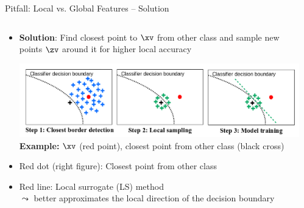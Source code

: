 \documentclass[11pt,compress,t,notes=noshow, aspectratio=169, xcolor=table]{beamer}
\begin{document}
\begin{frame}{Pitfall: Local vs. Global Features -- Solution }
\begin{columns}[T, totalwidth=\textwidth]
	\begin{column}{0.6\textwidth}
		\begin{itemize}
		\item \textbf{Solution}: 
		Find closest point to $\xv$ from other class and sample new points $\zv$ around it for higher local accuracy
		\begin{center}
		\includegraphics[width=\linewidth]{figure/laugel_method}
		\scriptsize{\textbf{Example:} $\xv$ (red point), closest point from other class (black cross)}
		\end{center}
		\pause
		\item Red dot (right figure): Closest point from other class

		\item Red line: Local surrogate (LS) method \\
		$\leadsto$ better approximates the local direction of the decision boundary 
	\end{itemize}
\end{column}
\begin{column}{0.39\textwidth}


\end{column}
\end{columns}
\end{frame}
\end{document}
